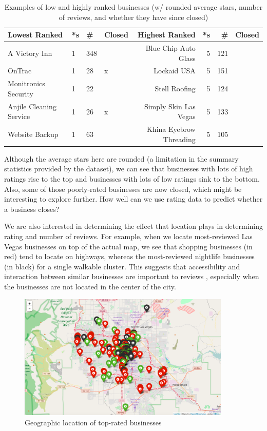 \documentclass[11pt]{article}
\begin{document}
\begin{table}[H]
\centering
\caption{Examples of low and highly ranked businesses (w/ rounded average stars, number of reviews, and whether they have since closed)}
\label{my-label}
\begin{tabular}{|l|l|l|l||r|r|r|r|}
	\hline
  \textbf{Lowest Ranked} & *s & \# & Closed & \textbf{Highest Ranked} & *s & \# & Closed \\ \hline
  A Victory Inn & 1 & 348 & 		 				      & Blue Chip Auto Glass & 5 & 121 & \\ \hline
  OnTrac & 1 & 28 & x                       & Lockaid USA & 5 & 151 &   \\ \hline
  Monitronics Security & 1 & 22 &            & Stell Roofing & 5 & 124 &  \\ \hline
  Anjile Cleaning Service & 1 & 26 & x  & Simply Skin Las Vegas & 5 & 133 &  \\ \hline
  Website Backup & 1 & 63 &                  & Khina Eyebrow Threading & 5 & 105 &  \\ \hline
\end{tabular}
\end{table}

\par Although the average stars here are rounded (a limitation in the summary statistics provided by the dataset), we can see that businesses with lots of high ratings rise to the top and businesses with lots of low ratings sink to the bottom. Also, some of those poorly-rated businesses are now closed, which might be interesting to explore further. How well can we use rating data to predict whether a business closes?

\par We are also interested in determining the effect that location plays in determining rating and number of reviews. For example, when we locate most-reviewed Las Vegas businesses on top of the actual map, we see that shopping businesses (in red) tend to locate on highways, whereas the most-reviewed nightlife businesses (in black) for a single walkable cluster. This suggests that accessibility and interaction between similar businesses are important to reviews , especially when the businesses are not located in the center of the city.
\begin{figure}[H]
\centering
\includegraphics[width=0.9\textwidth]{./ac209/mostreviewsbylocationlv.png}
\caption{Geographic location of top-rated businesses}
\end{figure}
\end{document}

